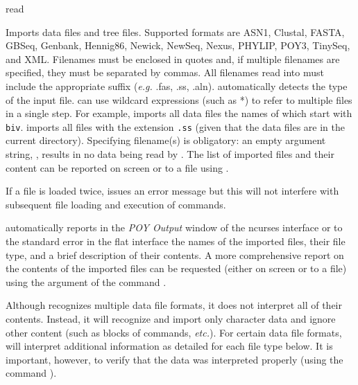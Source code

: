 \begin{command}{read}{}


	\begin{poydescription} 
        Imports data files and tree files.  Supported formats are ASN1, Clustal, FASTA,
        GBSeq, Genbank, Hennig86, Newick, NewSeq, Nexus, PHYLIP, POY3,
        TinySeq, and XML. Filenames must be enclosed in quotes and, if multiple
        filenames are specified, they must be separated by commas. 
        All filenames read into \poy must include the appropriate suffix (\emph{e.g.} .fas, .ss, .aln).
         automatically detects the type of the input file. 
         can use wildcard expressions (such as *) to
        refer to multiple files in a single step. For example,  
        imports all data files the names of which start
        with \texttt{biv}.  imports all files with
        the extension \texttt{.ss} (given that the data files are in the current directory).
        Specifying filename(s) is
        obligatory: an empty argument string, , results in no
        data being read by \poy. The list of imported files and their content
        can be reported on screen or to a file using .
        
        If a file is loaded twice, \poy issues an error message but this will not
        interfere with subsequent file loading and execution of commands.
        
       \poy automatically reports in the \emph{POY Output} window of the ncurses
            interface or to the standard error in the flat interface the names
            of the imported files, their file type, and a brief description of
            their contents. A more comprehensive report on the contents of the imported
            files can be requested (either on screen or to a file) using the argument
             of the command .

        \begin{statement}
        \setlength{\parindent}{0.5cm}
            Although \poy recognizes multiple data file formats, it does not
            interpret all of their contents. Instead, it will recognize and import
            only character data and ignore other content (such as blocks of
            commands, \emph{etc.}). For certain data file formats, \poy will interpret
            additional information as detailed for each file type below.
            It is important, however, to verify that the data was interpreted properly (using
            the command ).
            \end{statement}
          

\end{poydescription}
\end{command}
